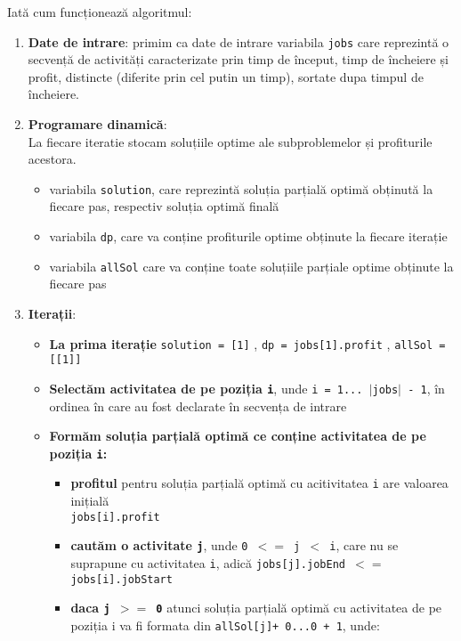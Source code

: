\newpage
Iată cum funcționează algoritmul:
\begin{enumerate}
    \item \textbf{Date de intrare}: primim ca date de intrare variabila \texttt{jobs} care reprezintă o secvență de activități caracterizate prin timp de început, timp de încheiere și profit,  distincte (diferite prin cel putin un timp), sortate dupa timpul de încheiere.
    \item \textbf{Programare dinamică}: \\
    La fiecare iteratie stocam soluțiile optime ale subproblemelor și profiturile acestora.
    \begin{itemize}
        \item variabila \texttt{solution}, care reprezintă soluția parțială optimă obținută la fiecare pas, respectiv soluția optimă finală 
        \item variabila \texttt{dp}, care va conține profiturile optime obținute la fiecare iterație
        \item  variabila \texttt{allSol} care va conține toate soluțiile parțiale optime obținute la fiecare pas
    \end{itemize} 
    \item \textbf{Iterații}: 
    \begin{itemize}
        \item \textbf{La prima iterație} \texttt{solution = [1]} , \texttt{dp = jobs[1].profit} , \texttt{allSol = [[1]]} 
        \item \textbf{Selectăm activitatea de pe poziția \texttt{i}}, unde \texttt{i = 1... $|$jobs$|$ - 1}, în ordinea în care au fost declarate în secvența de intrare
        \item \textbf{Formăm soluția parțială optimă ce conține activitatea de pe poziția \texttt{i}: }
        \begin{itemize}
            \item \textbf{profitul} pentru soluția parțială optimă cu acitivitatea \texttt{i} are valoarea inițială \\\texttt{jobs[i].profit}
            \item \textbf{cautăm o activitate \texttt{j}}, unde \texttt{0 $<$$=$ j $<$ i}, care nu se suprapune cu activitatea \texttt{i}, adică \texttt{jobs[j].jobEnd $<$$=$ jobs[i].jobStart }
            \item \textbf{daca \texttt{j $>$$=$ 0}} atunci soluția parțială optimă cu activitatea de pe poziția i va fi formata din 
            \texttt{allSol[j]+ 0...0 + 1}, unde:

\end{itemize}
\end{itemize}
\end{enumerate}
